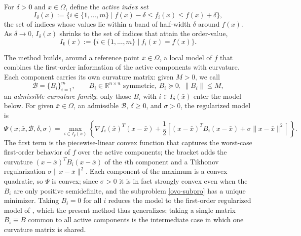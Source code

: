 \documentclass[11pt]{article}
\begin{document}
For $\delta > 0$ and $x \in \Omega$, define the \textit{active index set}
\begin{equation}
    I_\delta(x) := \{i \in \{1, \ldots, m\} \mid
    f(x) - \delta \leq f_i(x) \leq f(x) + \delta\}, \label{idelta}
\end{equation}
the set of indices whose values lie within a band of half-width $\delta$ around
$f(x)$. As $\delta \to 0$, $I_\delta(x)$ shrinks to the set of indices that
attain the order-value,
\begin{equation*}
    I_0(x) := \{i \in \{1, \ldots, m\} \mid f_i(x) = f(x)\}.
\end{equation*}

The method builds, around a reference point $\bar{x} \in \Omega$, a local model
of $f$ that combines the first-order information of the active components with
curvature. Each component carries its own curvature matrix: given $M > 0$, we
call
\begin{equation*}
    \mathcal{B} = \{ B_i \}_{i=1}^{m}, \qquad
    B_i \in \mathbb{R}^{n \times n} \text{ symmetric},\ B_i \succeq 0,\
    \|B_i\| \leq M,
\end{equation*}
an \textit{admissible curvature family}; only those $B_i$ with
$i \in I_\delta(\bar{x})$ enter the model below. For given $\bar{x} \in \Omega$,
an admissible $\mathcal{B}$, $\delta \geq 0$, and $\sigma > 0$, the regularized
model is
\begin{equation}
    \Psi(x; \bar{x}, \mathcal{B}, \delta, \sigma) =
    \max_{i \in I_\delta(\bar{x})}
    \left\lbrace \nabla f_i(\bar{x})^T(x - \bar{x})
    + \frac{1}{2} \left[ (x - \bar{x})^T B_i (x - \bar{x})
    + \sigma \|x - \bar{x}\|^2 \right]\right\rbrace. \label{model}
\end{equation}
The first term is the piecewise-linear convex function that captures the
worst-case first-order behavior of $f$ over the active components; the bracket
adds the curvature $(x - \bar{x})^T B_i (x - \bar{x})$ of the $i$th component
and a Tikhonov regularization $\sigma \|x - \bar{x}\|^2$. Each component of the
maximum is a convex quadratic, so $\Psi$ is convex; since $\sigma > 0$ it is in
fact strongly convex even when the $B_i$ are only positive semidefinite, and the
subproblem \eqref{ovo-subpro} has a unique minimizer. Taking $B_i = 0$ for all
$i$ reduces the model to the first-order regularized model of
\cite{alvarezovo}, which the present method thus generalizes; taking a single
matrix $B_i \equiv B$ common to all active components is the intermediate case
in which one curvature matrix is shared.
\end{document}
